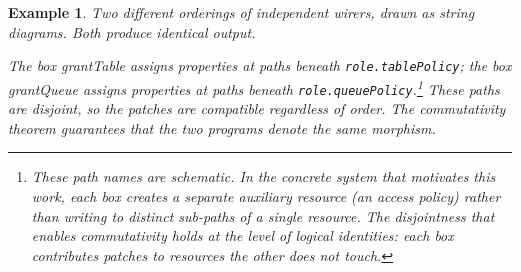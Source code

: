 \documentclass[11pt]{article}
\newtheorem{example}[theorem]{Example}
\begin{document}
    \begin{example}\label{ex:commute}
        Two different orderings of independent wirers, drawn as string diagrams. Both
        produce identical output.

        \bigskip
        \begin{center}
        \end{center}
        \bigskip

        The box \emph{grantTable} assigns properties at paths beneath
        \texttt{role.tablePolicy}; the box \emph{grantQueue} assigns properties at paths
        beneath \texttt{role.queuePolicy}.\footnote{These path names are
        schematic. In the concrete system that motivates this work, each box creates a
        separate auxiliary resource (an access policy) rather than writing to distinct
        sub-paths of a single resource. The disjointness that enables commutativity holds
        at the level of logical identities: each box contributes patches to resources the
        other does not touch.} These paths are disjoint, so the patches are compatible
        regardless of order. The commutativity theorem guarantees that the two programs
        denote the same morphism.
    \end{example}
\end{document}
